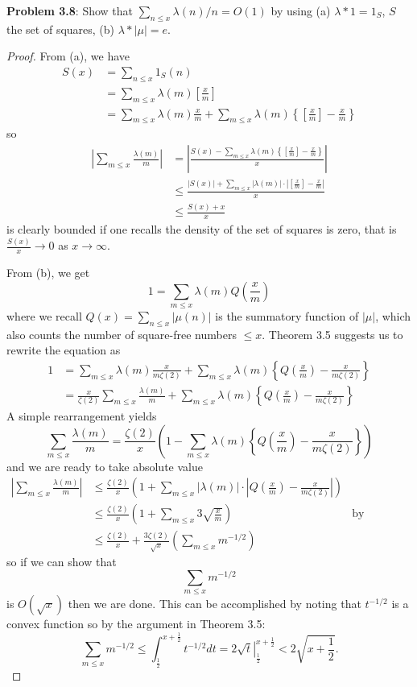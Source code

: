 \documentclass{article}
\newcommand{\IntPart}[1]{\left[ #1 \right]}
\newcommand{\Abs}[1]{\left| #1 \right|}
\newcommand{\O}[1]{O\left( #1 \right)}
\begin{document}
\textbf{Problem 3.8}: Show that $\sum_{n \leq x} \lambda(n)/n = \O{ 1 }$ by using (a) $\lambda * 1 = 1_S$, $S$ the set of squares, (b) $\lambda * |\mu| = e$.

\begin{proof}
From (a), we have
\begin{align*}
S(x) &= \sum_{n \leq x} 1_S(n)\\
&= \sum_{m \leq x} \lambda(m) \IntPart{\frac x m}\\
&= \sum_{m \leq x} \lambda(m) \frac x m + \sum_{m \leq x} \lambda(m) \left\{\IntPart{\frac x m} - \frac x m \right\}
\end{align*}
so
\begin{align*}
\Abs{\sum_{m \leq x} \frac{\lambda(m)}{m}} &= \Abs{\frac{S(x) - \sum_{m \leq x} \lambda(m) \left\{\IntPart{\frac x m} - \frac x m \right\}}{x}}\\
&\leq \frac{\Abs{S(x)} + \sum_{m \leq x} \Abs{\lambda(m)} \cdot \Abs{\IntPart{\frac x m} - \frac x m}}{x}\\
&\leq \frac{S(x) + x}{x}
\end{align*}
is clearly bounded if one recalls the density of the set of squares is zero, that is $\frac{S(x)}{x} \rightarrow 0$ as $x \rightarrow \infty$.

From (b), we get
$$1 = \sum_{m \leq x} \lambda(m) Q\left(\frac{x}{m}\right)$$
where we recall $Q(x) = \sum_{n \leq x} |\mu(n)|$ is the summatory function of $|\mu|$, which also counts the number of square-free numbers $\leq x$. Theorem 3.5 suggests us to rewrite the equation as
\begin{align*}
1 &= \sum_{m \leq x} \lambda(m) \frac{x}{m \zeta(2)} + \sum_{m \leq x} \lambda(m) \left\{Q\left(\frac{x}{m}\right) - \frac{x}{m \zeta(2)}\right\}\\
&= \frac{x}{\zeta(2)} \sum_{m \leq x} \frac{\lambda(m)}{m} + \sum_{m \leq x} \lambda(m) \left\{Q\left(\frac{x}{m}\right) - \frac{x}{m \zeta(2)}\right\}
\end{align*}
A simple rearrangement yields
$$\sum_{m \leq x} \frac{\lambda(m)}{m} = \frac{\zeta(2)}{x} \left( 1 - \sum_{m \leq x} \lambda(m) \left\{Q\left(\frac{x}{m}\right) - \frac{x}{m \zeta(2)}\right\} \right)$$
and we are ready to take absolute value
\begin{align*}
\Abs{\sum_{m \leq x} \frac{\lambda(m)}{m}} &\leq \frac{\zeta(2)}{x} \left(1 + \sum_{m \leq x} \Abs{\lambda(m)} \cdot \Abs{Q\left(\frac{x}{m}\right) - \frac{x}{m \zeta(2)}} \right)\\
&\leq \frac{\zeta(2)}{x} \left( 1 + \sum_{m \leq x} 3 \sqrt{\frac{x}{m}} \right) &\text{by Theorem 3.5}\\
&\leq \frac{\zeta(2)}{x} + \frac{3\zeta(2)}{\sqrt{x}} \left(\sum_{m \leq x} m^{-1/2}\right)
\end{align*}
so if we can show that
$$\sum_{m \leq x} m^{-1/2}$$
is $\O { \sqrt{x} }$ then we are done. This can be accomplished by noting that $t^{-1/2}$ is a convex function so by the argument in Theorem 3.5:
$$\sum_{m \leq x} m^{-1/2} \leq \int_{\frac 12}^{x + \frac 12} t^{-1/2} dt = \left. 2 \sqrt{t} \right|_{\frac 12}^{x + \frac 12} < 2 \sqrt{x + \frac 12}.$$
\end{proof}

\unless\ifdefined\IsMainDocument
\end{document}
